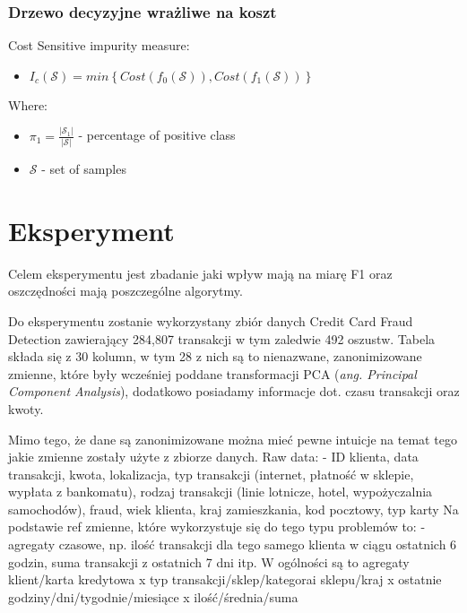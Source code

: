\documentclass{book}
\begin{document}
	\subsection{Drzewo decyzyjne wrażliwe na koszt}
	
	
	
		
		Cost Sensitive impurity measure:
		\begin{itemize}
			\item $I_c(\mathcal{S}) = min \left\{ Cost(f_0(\mathcal{S})), Cost(f_1(\mathcal{S})) \right\}$
		\end{itemize}{}
		
		Where:
		\begin{itemize}
			\item $\pi_1 = \frac{|\mathcal{S}_{1}|}{|\mathcal{S}|}$ - percentage of positive class
			\item $\mathcal{S}$ - set of samples
		\end{itemize}{}
	
	

\chapter{Eksperyment}

Celem eksperymentu jest zbadanie jaki wpływ mają na miarę F1 oraz oszczędności mają poszczególne algorytmy.

Do eksperymentu zostanie wykorzystany zbiór danych Credit Card Fraud Detection zawierający 284,807 transakcji w tym zaledwie 492 oszustw. Tabela składa się z 30 kolumn, w tym 28 z nich są to nienazwane, zanonimizowane zmienne, które były wcześniej poddane transformacji PCA (\textit{ang. Principal Component Analysis}), dodatkowo posiadamy informacje dot. czasu transakcji oraz kwoty. 

Mimo tego, że dane są zanonimizowane można mieć pewne intuicje na temat tego jakie zmienne zostały użyte z zbiorze danych. 
Raw data:
- ID klienta, data transakcji, kwota, lokalizacja, typ transakcji (internet, płatność w sklepie, wypłata z bankomatu), rodzaj transakcji (linie lotnicze, hotel, wypożyczalnia samochodów), fraud, wiek klienta, kraj zamieszkania, kod pocztowy, typ karty
Na podstawie ref zmienne, które wykorzystuje się do tego typu problemów to:
- agregaty czasowe, np. ilość transakcji dla tego samego klienta w ciągu ostatnich 6 godzin, suma transakcji z ostatnich 7 dni itp.
W ogólności są to agregaty klient/karta kredytowa x typ transakcji/sklep/kategorai sklepu/kraj x ostatnie godziny/dni/tygodnie/miesiące x ilość/średnia/suma
\end{document}
